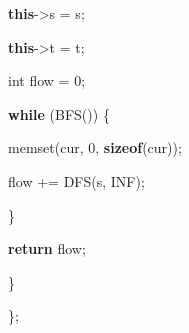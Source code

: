 \documentclass[
]{article}
\newenvironment{Shaded}{}{}
\newcommand{\ControlFlowTok}[1]{\textcolor[rgb]{0.00,0.44,0.13}{\textbf{#1}}}
\newcommand{\DataTypeTok}[1]{\textcolor[rgb]{0.56,0.13,0.00}{#1}}
\newcommand{\DecValTok}[1]{\textcolor[rgb]{0.25,0.63,0.44}{#1}}
\newcommand{\KeywordTok}[1]{\textcolor[rgb]{0.00,0.44,0.13}{\textbf{#1}}}
\newcommand{\NormalTok}[1]{#1}
\newcommand{\OperatorTok}[1]{\textcolor[rgb]{0.40,0.40,0.40}{#1}}
\begin{document}
\begin{Shaded}
\begin{Highlighting}[]
    \KeywordTok{this}\OperatorTok{{-}\textgreater{}}\NormalTok{s }\OperatorTok{=}\NormalTok{ s}\OperatorTok{;}

    \KeywordTok{this}\OperatorTok{{-}\textgreater{}}\NormalTok{t }\OperatorTok{=}\NormalTok{ t}\OperatorTok{;}

    \DataTypeTok{int}\NormalTok{ flow }\OperatorTok{=} \DecValTok{0}\OperatorTok{;}

    \ControlFlowTok{while} \OperatorTok{(}\NormalTok{BFS}\OperatorTok{())} \OperatorTok{\{}

\NormalTok{      memset}\OperatorTok{(}\NormalTok{cur}\OperatorTok{,} \DecValTok{0}\OperatorTok{,} \KeywordTok{sizeof}\OperatorTok{(}\NormalTok{cur}\OperatorTok{));}

\NormalTok{      flow }\OperatorTok{+=}\NormalTok{ DFS}\OperatorTok{(}\NormalTok{s}\OperatorTok{,}\NormalTok{ INF}\OperatorTok{);}

    \OperatorTok{\}}

    \ControlFlowTok{return}\NormalTok{ flow}\OperatorTok{;}

  \OperatorTok{\}}

\OperatorTok{\};}
\end{Highlighting}
\end{Shaded}
\end{document}
